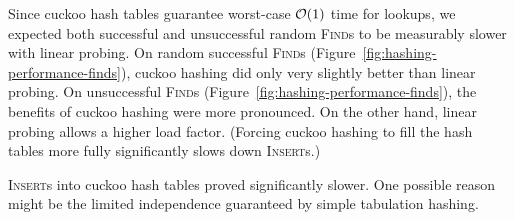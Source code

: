 Since cuckoo hash tables guarantee worst-case $\mathcal{O}(1)$ time for lookups,
we expected both successful and unsuccessful random \textsc{Find}s to be
measurably slower with linear probing.
On random successful \textsc{Find}s (Figure~\ref{fig:hashing-performance-finds}),
cuckoo hashing did only very slightly better than linear probing.
On unsuccessful \textsc{Find}s (Figure~\ref{fig:hashing-performance-finds}),
the benefits of cuckoo hashing were more pronounced.
On the other hand, linear probing allows a higher load factor.
(Forcing cuckoo hashing to fill the hash tables more fully significantly
slows down \textsc{Insert}s.)

\textsc{Insert}s into cuckoo hash tables proved significantly slower.
One possible reason might be the limited independence guaranteed by simple
tabulation hashing.

